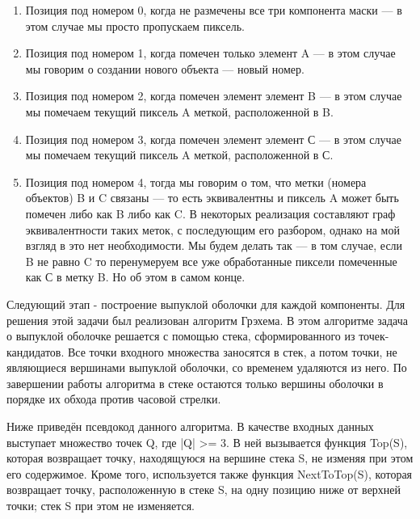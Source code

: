 \documentclass{report}
\begin{document}
\begin{enumerate}
	\item Позиция под номером 0, когда не размечены все три компонента маски — в этом случае мы просто пропускаем пиксель.
	\item Позиция под номером 1, когда помечен только элемент A — в этом случае мы говорим о создании нового объекта — новый номер.
	\item Позиция под номером 2, когда помечен элемент элемент B — в этом случае мы помечаем текущий пиксель A меткой, расположенной в B.
	\item Позиция под номером 3, когда помечен элемент элемент С — в этом случае мы помечаем текущий пиксель A меткой, расположенной в С.
	\item Позиция под номером 4, тогда мы говорим о том, что метки (номера объектов) B и C связаны — то есть эквивалентны и пиксель A может быть помечен либо как B либо как C. В некоторых реализация составляют граф эквивалентности таких меток, с последующим его разбором, однако на мой взгляд в это нет необходимости. Мы будем делать так — в том случае, если B не равно C то перенумеруем все уже обработанные пиксели помеченные как С в метку B. Но об этом в самом конце.
\end{enumerate}

\par
Следующий этап - построение выпуклой оболочки для каждой компоненты. Для решения этой задачи был реализован алгоритм Грэхема. В этом алгоритме задача о выпуклой оболочке решается с помощью стека, сформированного из точек-кандидатов. Все точки входного множества заносятся в стек, а потом точки, не являющиеся вершинами выпуклой оболочки, со временем удаляются из него. По завершении работы алгоритма в стеке остаются только вершины оболочки в порядке их обхода против часовой стрелки.
\par
Ниже приведён псевдокод данного алгоритма. В качестве входных данных выступает множество точек Q, где  |Q| >= 3. В ней вызывается функция Top(S), которая возвращает точку, находящуюся на вершине стека S, не изменяя при этом его содержимое. Кроме того, используется также функция NextToTop(S), которая возвращает точку, расположенную в стеке S, на одну позицию ниже от верхней точки; стек S при этом не изменяется.
\end{document}
